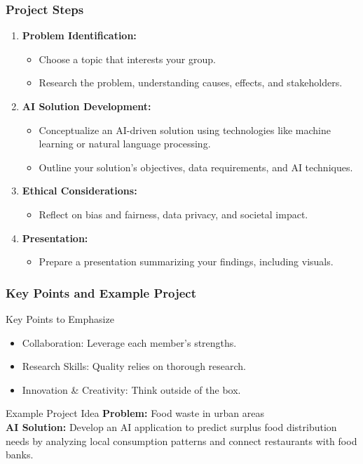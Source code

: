 \documentclass{beamer}
\begin{document}
\begin{frame}[fragile]
    \frametitle{Project Steps}
    \begin{enumerate}
        \item \textbf{Problem Identification:}
        \begin{itemize}
            \item Choose a topic that interests your group.
            \item Research the problem, understanding causes, effects, and stakeholders.
        \end{itemize}

        \item \textbf{AI Solution Development:}
        \begin{itemize}
            \item Conceptualize an AI-driven solution using technologies like machine learning or natural language processing.
            \item Outline your solution's objectives, data requirements, and AI techniques.
        \end{itemize}

        \item \textbf{Ethical Considerations:}
        \begin{itemize}
            \item Reflect on bias and fairness, data privacy, and societal impact.
        \end{itemize}
        
        \item \textbf{Presentation:}
        \begin{itemize}
            \item Prepare a presentation summarizing your findings, including visuals.
        \end{itemize}
    \end{enumerate}
\end{frame}

\begin{frame}[fragile]
    \frametitle{Key Points and Example Project}
    \begin{block}{Key Points to Emphasize}
        \begin{itemize}
            \item Collaboration: Leverage each member's strengths.
            \item Research Skills: Quality relies on thorough research.
            \item Innovation \& Creativity: Think outside of the box.
        \end{itemize}
    \end{block}
    
    \begin{block}{Example Project Idea}
        \textbf{Problem:} Food waste in urban areas\\
        \textbf{AI Solution:} Develop an AI application to predict surplus food distribution needs by analyzing local consumption patterns and connect restaurants with food banks.
    \end{block}
\end{frame}
\end{document}
